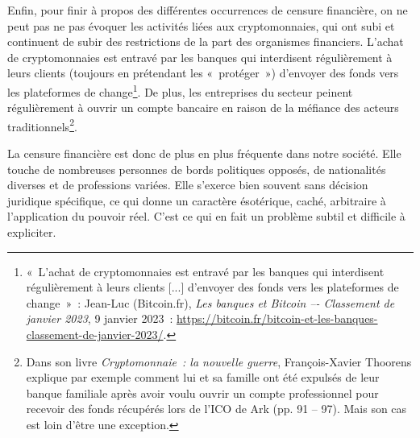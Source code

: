 \clearpage
Enfin, pour finir à propos des différentes occurrences de censure financière, on ne peut pas ne pas évoquer les activités liées aux cryptomonnaies, qui ont subi et continuent de subir des restrictions de la part des organismes financiers. L'achat de cryptomonnaies est entravé par les banques qui interdisent régulièrement à leurs clients (toujours en prétendant les «~protéger~») d'envoyer des fonds vers les plateformes de change\footnote{«~L'achat de cryptomonnaies est entravé par les banques qui interdisent régulièrement à leurs clients [...] d'envoyer des fonds vers les plateformes de change~»~: Jean-Luc (Bitcoin.fr), \emph{Les banques et Bitcoin –- Classement de janvier 2023}, 9 janvier 2023~: \url{https://bitcoin.fr/bitcoin-et-les-banques-classement-de-janvier-2023/}.}. De plus, les entreprises du secteur peinent régulièrement à ouvrir un compte bancaire en raison de la méfiance des acteurs traditionnels\footnote{Dans son livre \emph{Cryptomonnaie~: la nouvelle guerre}, François-Xavier Thoorens explique par exemple comment lui et sa famille ont été expulsés de leur banque familiale après avoir voulu ouvrir un compte professionnel pour recevoir des fonds récupérés lors de l'ICO de Ark (pp. 91 -- 97). Mais son cas est loin d'être une exception.}.

La censure financière est donc de plus en plus fréquente dans notre société. Elle touche de nombreuses personnes de bords politiques opposés, de nationalités diverses et de professions variées. Elle s'exerce bien souvent sans décision juridique spécifique, ce qui donne un caractère ésotérique, caché, arbitraire à l'application du pouvoir réel. C'est ce qui en fait un problème subtil et difficile à expliciter.

